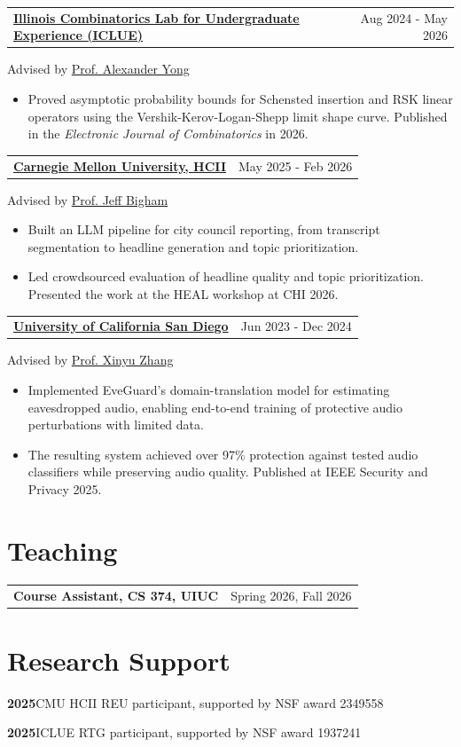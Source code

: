 \documentclass[letterpaper,11pt]{article}
\makeatletter
\newcommand{\role}[3]{\par\addvspace{3pt}\begin{tabularx}{\textwidth}{@{}Xr@{}}\textbf{#1}&\small #2\end{tabularx}\par{\small #3}\par}
\makeatother
\begin{document}
\role{\href{https://ayong.web.illinois.edu/ICLUE.html}{Illinois Combinatorics Lab for Undergraduate Experience (ICLUE)}}{Aug 2024 - May 2026}{Advised by \href{https://ayong.web.illinois.edu/}{Prof. Alexander Yong}}
\begin{itemize}
\item Proved asymptotic probability bounds for Schensted insertion and RSK linear operators using the Vershik-Kerov-Logan-Shepp limit shape curve. Published in the \emph{Electronic Journal of Combinatorics} in 2026.
\end{itemize}
\role{\href{https://www.cs.cmu.edu/~jbigham/}{Carnegie Mellon University, HCII}}{May 2025 - Feb 2026}{Advised by \href{https://www.cs.cmu.edu/~jbigham/}{Prof. Jeff Bigham}}
\begin{itemize}
\item Built an LLM pipeline for city council reporting, from transcript segmentation to headline generation and topic prioritization.
\item Led crowdsourced evaluation of headline quality and topic prioritization. Presented the work at the HEAL workshop at CHI 2026.
\end{itemize}
\role{\href{https://xyzhang.ucsd.edu/index.html}{University of California San Diego}}{Jun 2023 - Dec 2024}{Advised by \href{https://xyzhang.ucsd.edu/index.html}{Prof. Xinyu Zhang}}
\begin{itemize}
\item Implemented EveGuard's domain-translation model for estimating eavesdropped audio, enabling end-to-end training of protective audio perturbations with limited data.
\item The resulting system achieved over 97\% protection against tested audio classifiers while preserving audio quality. Published at IEEE Security and Privacy 2025.
\end{itemize}
\section{Teaching}
\role{Course Assistant, CS 374, UIUC}{Spring 2026, Fall 2026}{}
\section{Research Support}
\textbf{2025}\quad CMU HCII REU participant, supported by NSF award 2349558\par
\textbf{2025}\quad ICLUE RTG participant, supported by NSF award 1937241\par
\end{document}
